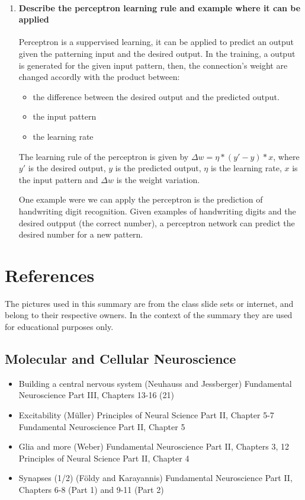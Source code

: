 \documentclass[12pt,article,oneside,a4paper]{memoir}
\begin{document}
\begin{enumerate}

\item \paragraph{Describe the perceptron learning rule and example where it can be applied} 
Perceptron is a suppervised learning, it can be applied to predict an output given the patterning input and the desired output. In the training, a output is generated for the given input pattern, then, the connection's weight are changed accordly with the product between:
\begin{itemize}
\item the difference between the desired output and the predicted output.
\item the input pattern 
\item the learning rate
\end{itemize}
The learning rule of the perceptron is given by $\Delta w = \eta *(y\prime - y) * x$, where $y\prime$ is the desired output, $y$ is the predicted output, $\eta$ is the learning rate, $x$ is the input pattern and $\Delta w$ is the weight variation.

One example were we can apply the perceptron is the prediction of handwriting digit recognition. Given examples of handwriting digits and the desired outpput (the correct number), a perceptron network can predict the desired number for a new pattern.
\end{enumerate}

\newpage

\section{References}
The pictures used in this summary are from the class slide sets or internet, and belong to their respective owners. In the context of the summary they are used for educational purposes only.

\subsection{Molecular and Cellular Neuroscience}
\begin{itemize}
\item Building a central nervous system (Neuhauss and Jessberger)
\subitem Fundamental Neuroscience Part III, Chapters 13-16 (21)
\item Excitability (Müller)
\subitem Principles of Neural Science Part II, Chapter 5-7
\subitem Fundamental Neuroscience Part II, Chapter 5
\item Glia and more (Weber)
\subitem Fundamental Neuroscience Part II, Chapters 3, 12
\subitem Principles of Neural Science Part II, Chapter 4
\item Synapses (1/2) (Földy and Karayannis)
\subitem Fundamental Neuroscience Part II, Chapters 6-8 (Part 1) and 9-11 (Part 2)
\end{itemize}
\end{document}
